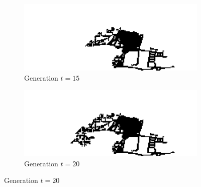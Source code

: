 \begin{figure}[H]
\begin{multicols}{2}
\begin{subfigure}{.5\textwidth}
  \centering
  \includegraphics[width=1\linewidth]{Figures/Chapter4/generation-15-melusi}
  \caption{Generation $t = 15$}
\end{subfigure}
\begin{subfigure}{.5\textwidth}
  \centering
  \includegraphics[width=1\linewidth]{Figures/Chapter4/generation-20-melusi}
  \caption{Generation $t = 20$}
\end{subfigure}
\end{multicols}


\end{figure}
